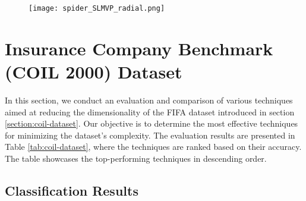 \begin{figure}[!h]
    \centering
    \texttt{[image: spider\_SLMVP\_radial.png]}
    \label{fig:spider_slmvp_fifa}
\end{figure}



\section{Insurance Company Benchmark (COIL 2000) Dataset}

In this section, we conduct an evaluation and comparison of various techniques aimed at reducing the dimensionality of the FIFA dataset introduced in section \ref{section:coil-dataset}. Our objective is to determine the most effective techniques for minimizing the dataset's complexity. The evaluation results are presented in Table \ref{tab:coil-dataset}, where the techniques are ranked based on their accuracy. The table showcases the top-performing techniques in descending order.

\subsection{Classification Results}

